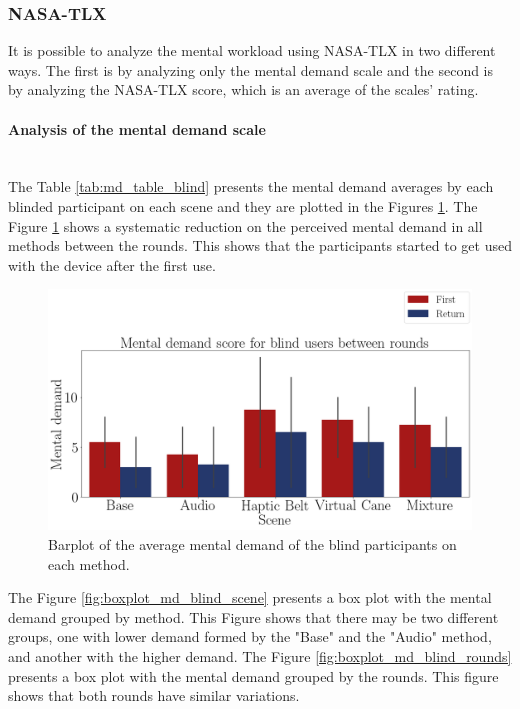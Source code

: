 \subsubsection{NASA-TLX}
\label{subsec:results_nasa_tlx}

It is possible to analyze the mental workload using NASA-TLX in two different ways. The first is by analyzing only the mental demand scale and the second is by analyzing the NASA-TLX score, which is an average of the scales’ rating.

\paragraph{Analysis of the mental demand scale}\mbox{}\\

The Table \ref{tab:md_table_blind} presents the mental demand averages by each blinded participant on each scene and they are plotted in the Figures \ref{fig:barplot_md_avg_5_scene_blind}. The Figure \ref{fig:barplot_md_avg_5_scene_blind} shows a systematic reduction on the perceived mental demand in all methods between the rounds. This shows that the participants started to get used with the device after the first use.



\begin{figure}[!htb]
    \centering
    \includegraphics[width = 0.8\linewidth]{Resultados/Nasa/Figuras/png/barplot_md_avg_5_scene_blind.png}
    \caption{Barplot of the average mental demand of the blind participants on each method.}
    \label{fig:barplot_md_avg_5_scene_blind}
\end{figure}

The Figure \ref{fig:boxplot_md_blind_scene} presents a box plot with the mental demand grouped by method. This Figure shows that there may be two different groups, one with lower demand formed by the "Base" and the "Audio" method, and another with the higher demand. The Figure \ref{fig:boxplot_md_blind_rounds} presents a box plot with the mental demand grouped by the rounds. This figure shows that both rounds have similar variations.

